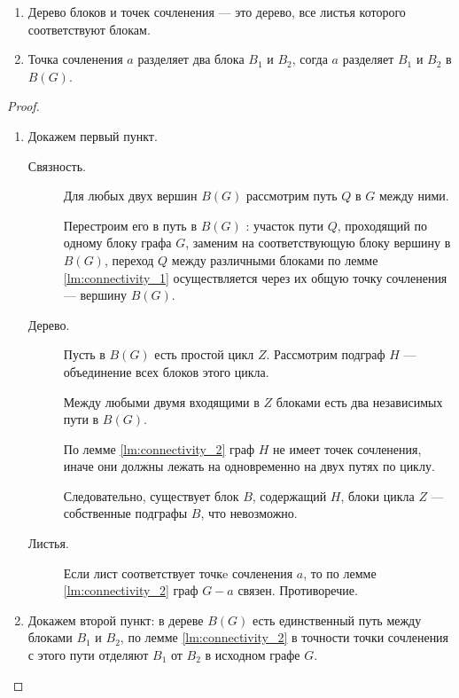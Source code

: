 \begin{theorem}
    \begin{enumerate}
		\item  Дерево блоков и точек сочленения --- это дерево, все листья которого соответствуют блокам.
		\item Точка сочленения $a$ разделяет два блока $B_1$ и $B_2$, согда $a$ разделяет $B_1$ и $B_2$ в $B(G)$.
    \end{enumerate}
\end{theorem}
\begin{proof}
    \begin{enumerate}
		\item Докажем первый пункт.
			\begin{description}
				\item[Связность.] Для любых двух вершин $B(G)$ рассмотрим путь $Q$ в $G$ между ними.

					Перестроим его в путь в $B(G)$ : участок пути $Q$, проходящий по одному блоку графа $G$, заменим на соответствующую блоку вершину в $B(G)$, переход $Q$ между различными блоками по лемме \ref{lm:connectivity_1} осуществляется через их общую точку сочленения --- вершину $B(G)$.
				\item[Дерево.] Пусть в $B(G)$ есть простой цикл $Z$. Рассмотрим подграф $H$ --- объединение всех блоков этого цикла. 

					Между любыми двумя входящими в  $ Z$ блоками есть два независимых пути в $B(G)$.

					По лемме \ref{lm:connectivity_2} граф $H$ не имеет точек сочленения, иначе они должны лежать на одновременно на двух путях по циклу.

					Следовательно, существует блок $B$, содержащий $H$, блоки цикла $Z$ --- собственные подграфы $B$, что невозможно.
				\item [Листья.] Если лист соответствует точкe сочленения $a$, то по лемме \ref{lm:connectivity_2} граф $G-a$ связен. Противоречие. 
			\end{description}
		\item Докажем второй пункт: в дереве $B(G)$ есть единственный путь между блоками $B_1$ и $B_2$, по лемме \ref{lm:connectivity_2} в точности точки сочленения с этого пути отделяют $B_1$ от $B_2$ в исходном графе $G$.
    \end{enumerate}
\end{proof}
